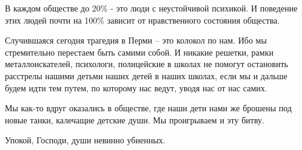 В каждом обществе до 20\% - это люди с неустойчивой психикой. И поведение этих
людей почти на 100\% зависит от нравственного состояния общества.

Случившаяся сегодня трагедия в Перми – это колокол по нам. Ибо мы стремительно
перестаем быть самими собой. И никакие решетки, рамки металлоискателей,
психологи, полицейские в школах не помогут остановить расстрелы нашими детьми
наших детей в наших школах, если мы и дальше будем идти тем путем, по которому
нас ведут, уводя нас от нас самих. 

Мы как-то вдруг оказались в обществе, где наши дети нами же брошены под новые
танки, калечащие детские души. Мы проигрываем и эту битву.

Упокой, Господи, души невинно убиенных.

